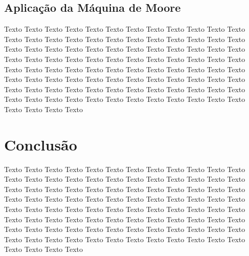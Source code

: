 \documentclass[a4paper]{article}
\begin{document}
\subsection{Aplicação da Máquina de Moore }

Texto Texto Texto Texto Texto Texto Texto Texto Texto Texto Texto Texto Texto Texto Texto Texto Texto Texto Texto Texto Texto Texto Texto Texto Texto Texto Texto Texto Texto Texto Texto Texto Texto Texto Texto Texto Texto Texto Texto Texto Texto Texto Texto Texto Texto Texto Texto Texto Texto Texto Texto Texto Texto Texto Texto Texto Texto Texto Texto Texto Texto Texto Texto Texto Texto Texto Texto Texto Texto Texto Texto Texto Texto Texto Texto Texto Texto Texto Texto Texto Texto Texto Texto Texto Texto Texto Texto Texto Texto Texto Texto Texto Texto Texto Texto Texto Texto Texto Texto Texto 

\section{Conclusão}

Texto Texto Texto Texto Texto Texto Texto Texto Texto Texto Texto Texto Texto Texto Texto Texto Texto Texto Texto Texto Texto Texto Texto Texto Texto Texto Texto Texto Texto Texto Texto Texto Texto Texto Texto Texto Texto Texto Texto Texto Texto Texto Texto Texto Texto Texto Texto Texto Texto Texto Texto Texto Texto Texto Texto Texto Texto Texto Texto Texto Texto Texto Texto Texto Texto Texto Texto Texto Texto Texto Texto Texto Texto Texto Texto Texto Texto Texto Texto Texto Texto Texto Texto Texto Texto Texto Texto Texto Texto Texto Texto Texto Texto Texto Texto Texto Texto Texto Texto Texto 
\end{document}
